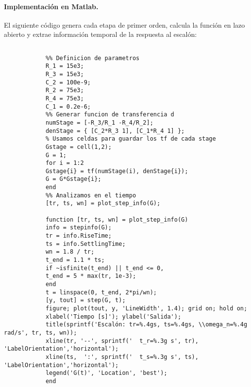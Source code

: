 \paragraph{Implementación en Matlab.}  
El siguiente código genera cada etapa de primer orden, calcula la función en lazo abierto y extrae información temporal de la respuesta al escalón:



\begin{strip}
	\vspace{-\baselineskip} %
	\noindent
	\begin{minipage}{0.98\textwidth}
		\begin{lstlisting}[style=matlabstyle,caption={Script en Matlab},label={lst:mat}]
			
			%% Definicion de parametros
			R_1 = 15e3;
			R_3 = 15e3;
			C_2 = 100e-9;
			R_2 = 75e3;
			R_4 = 75e3;
			C_1 = 0.2e-6;
			%% Generar funcion de transferencia d
			numStage = [-R_3/R_1 -R_4/R_2];
			denStage = { [C_2*R_3 1], [C_1*R_4 1] };
			% Usamos celdas para guardar los tf de cada stage
			Gstage = cell(1,2);
			G = 1;
			for i = 1:2
			Gstage{i} = tf(numStage(i), denStage{i});
			G = G*Gstage{i};
			end
			%% Analizamos en el tiempo
			[tr, ts, wn] = plot_step_info(G);
			
			function [tr, ts, wn] = plot_step_info(G)
			info = stepinfo(G);
			tr = info.RiseTime;
			ts = info.SettlingTime;
			wn = 1.8 / tr;
			t_end = 1.1 * ts;
			if ~isfinite(t_end) || t_end <= 0, 
			t_end = 5 * max(tr, 1e-3); 
			end
			t = linspace(0, t_end, 2*pi/wn);
			[y, tout] = step(G, t);
			figure; plot(tout, y, 'LineWidth', 1.4); grid on; hold on;
			xlabel('Tiempo [s]'); ylabel('Salida');
			title(sprintf('Escalón: tr=%.4gs, ts=%.4gs, \\omega_n=%.4g rad/s', tr, ts, wn));
			xline(tr, '--', sprintf('  t_r=%.3g s', tr), 'LabelOrientation','horizontal');
			xline(ts,  ':', sprintf('  t_s=%.3g s', ts), 'LabelOrientation','horizontal');
			legend('G(t)', 'Location', 'best');
			end
			
		\end{lstlisting}
	\end{minipage}
	\vspace{-\baselineskip} %
\end{strip}


